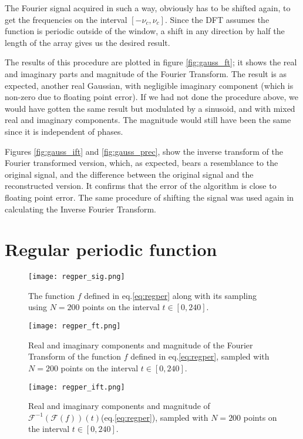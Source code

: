 \documentclass[10pt,a4paper,twocolumn]{article}
\begin{document}
The Fourier signal acquired in such a way, obviously has to be shifted again, to get the frequencies on the interval $[-\nu_c, \nu_c]$. Since the DFT assumes the function is periodic outside of the window, a shift in any direction by half the length of the array gives us the desired result.

The results of this procedure are plotted in figure \ref{fig:gauss_ft}; it shows the real and imaginary parts and magnitude of the Fourier Transform. The result is as expected, another real Gaussian, with negligible imaginary component (which is non-zero due to floating point error). If we had not done the procedure above, we would have gotten the same result but modulated by a sinusoid, and with mixed real and imaginary components. The magnitude would still have been the same since it is independent of phases.

Figures \ref{fig:gauss_ift} and \ref{fig:gauss_prec}, show the inverse transform of the Fourier transformed version, which, as expected, bears a resemblance to the original signal, and the difference between the original signal and the reconstructed version. It confirms that the error of the algorithm is close to floating point error. The same procedure of shifting the signal was used again in calculating the Inverse Fourier Transform.


\section{Regular periodic function}

\begin{figure}
\centering
\captionsetup{justification=centering}
\texttt{[image: regper\_sig.png]}
\caption{The function $f$ defined in eq.\ref{eq:regper} along with its sampling using $N=200$ points on the interval $t \in [0, 240]$.}
\label{fig:regper_sig}
\end{figure}

\begin{figure}
\centering
\captionsetup{justification=centering}
\texttt{[image: regper\_ft.png]}
\caption{Real and imaginary components and magnitude of the Fourier Transform of the function $f$ defined in eq.\ref{eq:regper}, sampled with $N=200$ points on the interval $t \in [0,240]$.}
\label{fig:regper_ft}
\end{figure}

\begin{figure}
\centering
\captionsetup{justification=centering}
\texttt{[image: regper\_ift.png]}
\caption{Real and imaginary components and magnitude of $\mathcal{F}^{-1} \left( \mathcal{F} \left( f \right) \right)(t)$(eq.\ref{eq:regper}), sampled with $N=200$ points on the interval $t \in [0,240]$.}
\label{fig:regper_ift}
\end{figure}
\end{document}
